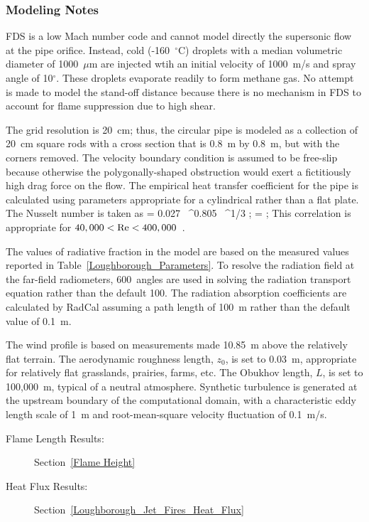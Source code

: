 \subsubsection{Modeling Notes}

FDS is a low Mach number code and cannot model directly the supersonic flow at the pipe orifice. Instead, cold (-160~$^\circ$C) droplets with a median volumetric diameter of 1000~$\mu$m are injected wtih an initial velocity of 1000~m/s and spray angle of 10$^\circ$. These droplets evaporate readily to form methane gas. No attempt is made to model the stand-off distance because there is no mechanism in FDS to account for flame suppression due to high shear.

The grid resolution is 20~cm; thus, the circular pipe is modeled as a collection of 20~cm square rods with a cross section that is 0.8~m by 0.8~m, but with the corners removed. The velocity boundary condition is assumed to be free-slip because otherwise the polygonally-shaped obstruction would exert a fictitiously high drag force on the flow. The empirical heat transfer coefficient for the pipe is calculated using parameters appropriate for a cylindrical rather than a flat plate. The Nusselt number is taken as 
\be
   \NU = 0.027 \, \RE^{0.805} \, \PR^{1/3} \quad ; \quad \RE =  \quad ; \quad {}
\ee
This correlation is appropriate for $40,000 < \hbox{Re} < 400,000$~\cite{Incropera:1}.

The values of radiative fraction in the model are based on the measured values reported in Table~\ref{Loughborough_Parameters}. To resolve the radiation field at the far-field radiometers, 600~angles are used in solving the radiation transport equation rather than the default 100. The radiation absorption coefficients are calculated by RadCal assuming a path length of 100~m rather than the default value of 0.1~m. 

The wind profile is based on measurements made 10.85~m above the relatively flat terrain. The aerodynamic roughness length, $z_0$, is set to 0.03~m, appropriate for relatively flat grasslands, prairies, farms, etc. The Obukhov length, $L$, is set to 100,000~m, typical of a neutral atmosphere. Synthetic turbulence is generated at the upstream boundary of the computational domain, with a characteristic eddy length scale of 1~m and root-mean-square velocity fluctuation of 0.1~m/s.

\begin{description}
\item[Flame Length Results:] Section~\ref{Flame Height}
\item[Heat Flux Results:] Section~\ref{Loughborough_Jet_Fires_Heat_Flux}
\end{description}


